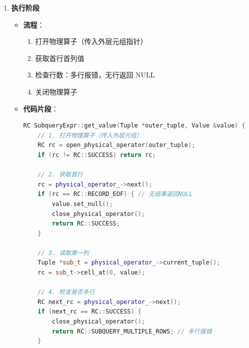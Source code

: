 \documentclass[a4paper, 12pt]{article}
\begin{document}
\begin{enumerate}
\begin{itemize}
\begin{lstlisting}[language=C++]
// 为过滤条件中的子查询生成物理算子
if (comparison_expr->left()->type() == ExprType::SUB_QUERY) {
    auto sub_query_expr = static_cast<SubqueryExpr*>(expr.get());
    if (session) sub_query_expr->set_trx(session->current_trx());
    unique_ptr<PhysicalOperator> subquery_phy_oper;
    RC rc = create(*sub_query_expr->logical_operator(), 
                  subquery_phy_oper, 
                  session);
    sub_query_expr->set_physical_operator(std::move(subquery_phy_oper));
}
        \end{lstlisting}
        \item \textbf{说明}：物理算子生成后存储到 \texttt{SubqueryExpr} 中，供执行阶段使用。
    \end{itemize}

    \item \textbf{执行阶段}
    
\begin{itemize}
        \item \textbf{流程}：
        \begin{enumerate}
            \item 打开物理算子（传入外层元组指针）
            \item 获取首行首列值
            \item 检查行数：多行报错，无行返回 NULL
            \item 关闭物理算子
        \end{enumerate}
        \item \textbf{代码片段}：
        
\begin{lstlisting}[language=C++]
RC SubqueryExpr::get_value(Tuple *outer_tuple, Value &value) {
    // 1. 打开物理算子（传入外层元组）
    RC rc = open_physical_operator(outer_tuple);
    if (rc != RC::SUCCESS) return rc;
    
    // 2. 获取首行
    rc = physical_operator_->next();
    if (rc == RC::RECORD_EOF) { // 无结果返回NULL
        value.set_null();
        close_physical_operator();
        return RC::SUCCESS;
    }
    
    // 3. 读取第一列
    Tuple *sub_t = physical_operator_->current_tuple();
    rc = sub_t->cell_at(0, value);
    
    // 4. 检查是否多行
    RC next_rc = physical_operator_->next();
    if (next_rc == RC::SUCCESS) {
        close_physical_operator();
        return RC::SUBQUERY_MULTIPLE_ROWS; // 多行报错
    }
    

\end{lstlisting}
\end{itemize}
\end{enumerate}
\end{document}
